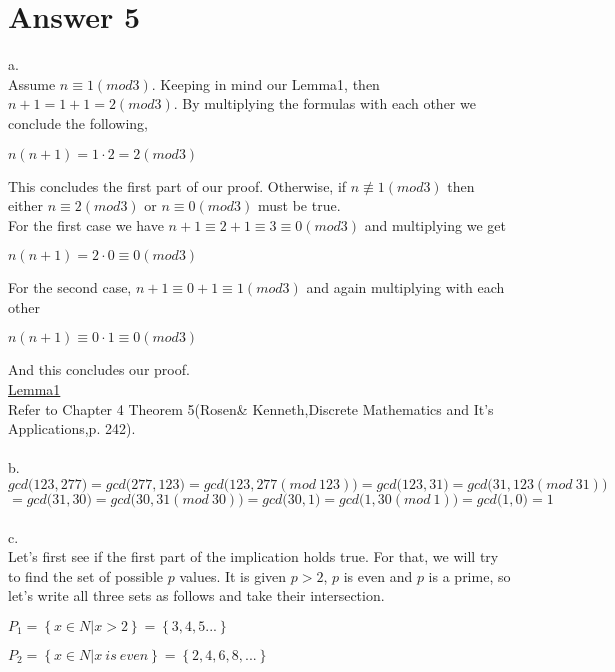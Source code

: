 \documentclass[12pt]{article}
\begin{document}
\section*{Answer 5}

a.\\
Assume $n\equiv 1 (mod 3)$. Keeping in mind our Lemma1, then $n+1=1+1=2 (mod 3)$. By multiplying the formulas with each other we conclude the following,
\begin{center} 
$n(n+1)=1\cdot 2=2 (mod3)$
\end{center}
This concludes the first part of our proof. Otherwise, if $n\not \equiv 1(mod3)$ then either $n\equiv 2 (mod 3)$ or $n\equiv 0 (mod 3)$  must be true.\\
For the first case we have $n+1 \equiv 2+1 \equiv 3 \equiv 0(mod3)$ and multiplying we get
\begin{center} 
$n(n+1)=2\cdot 0\equiv 0(mod3)$
\end{center}
For the second case, $n+1\equiv 0+1\equiv 1(mod3)$ and again multiplying with each other
\begin{center}
$n(n+1)\equiv 0\cdot 1\equiv 0(mod3)$
\end{center}
And this concludes our proof.\\
\underline{Lemma1}\\
Refer to Chapter 4 Theorem 5(Rosen\& Kenneth,Discrete Mathematics and It's Applications,p. 242).\\\\
b.\\
$gcd\big (123,277\big )=gcd\big (277,123\big )=gcd\big (123,277(mod\:123)\big )=gcd\big (123,31\big )= gcd\big (31,123(mod\: 31)\big )$\\$=gcd\big (31,30\big )= gcd\big (30,31(mod\:30)\big )=gcd\big (30,1\big )=gcd\big (1,30(mod\:1)\big )=gcd\big (1,0\big )=1$\\\\
c.\\
Let's first see if the first part of the implication holds true. For that, we will try to find the set of possible $p$ values. It is given $p>2$, $p$ is even and $p$ is a prime, so let's write all three sets as follows and take their intersection.
\begin{center}
$P_1 = \left\{ {x\in N| x >2} \right\}=\left\{{3,4,5...} \right\}$
\end{center}
\begin{center}
$P_2=\left\{{x\in N| x\: is\: even}\right\}=\left\{{2,4,6,8,...}\right\}$
\end{center}
\end{document}
